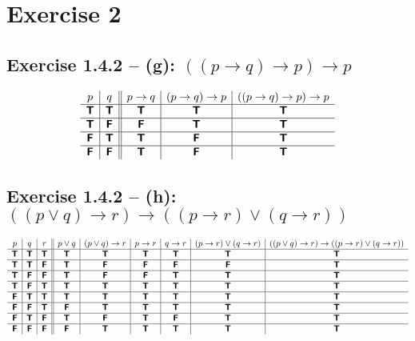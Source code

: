 \documentclass[11pt]{article}
\newcommand{\TTT}{\bm{\mathsf{T}}}
\newcommand{\FFF}{\bm{\mathsf{F}}}
\begin{document}
\section*{Exercise 2}

\subsection*{Exercise 1.4.2 -- (g): $((p \to q) \to p) \to p$}
\[
\begin{array}{ c | c || c | c | c}
 p & q & p \to q & (p \to q) \to p &  ((p \to q) \to p) \to p
\\ \hline 
 \TTT & \TTT & \TTT & \TTT & \TTT\\ \hline  
 \TTT & \FFF & \FFF & \TTT & \TTT\\ \hline  
 \FFF & \TTT & \TTT & \FFF & \TTT\\ \hline  
 \FFF & \FFF & \TTT & \FFF & \TTT  
\end{array}
\]

\subsection*{Exercise 1.4.2 -- (h): $((p \lor q) \to r) \to ((p \to r) \lor (q \to r))$}
\[
\begin{array}{ c | c | c || c | c | c | c | c | c}
    p & q & r & p \lor q & (p \lor q) \to r& p \to r & q \to r & (p \to r) \lor (q \to r) & ((p \lor q) \to r) \to ((p \to r) \lor (q \to r))\\ \hline 
    \TTT & \TTT & \TTT & \TTT & \TTT & \TTT & \TTT & \TTT & \TTT\\ \hline  
    \TTT & \TTT & \FFF & \TTT & \FFF & \FFF & \FFF & \FFF & \TTT\\ \hline  
    \TTT & \FFF & \FFF & \TTT & \FFF & \FFF & \TTT & \TTT & \TTT\\ \hline  
    \TTT & \FFF & \TTT & \TTT & \TTT & \TTT & \TTT & \TTT & \TTT\\ \hline  
    \FFF & \TTT & \TTT & \TTT & \TTT & \TTT & \TTT & \TTT & \TTT\\ \hline  
    \FFF & \FFF & \TTT & \FFF & \TTT & \TTT & \TTT & \TTT & \TTT\\ \hline  
    \FFF & \TTT & \FFF & \TTT & \FFF & \TTT & \FFF & \TTT & \TTT\\ \hline
    \FFF & \FFF & \FFF & \FFF & \TTT & \TTT & \TTT & \TTT & \TTT
   \end{array}
\]
\end{document}
